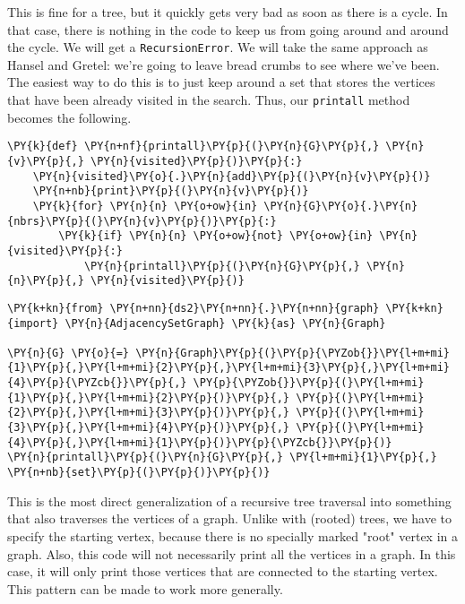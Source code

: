 This is fine for a tree, but it quickly gets very bad as soon as there is a cycle.
In that case, there is nothing in the code to keep us from going around and around the cycle.
We will get a \texttt{RecursionError}.
We will take the same approach as Hansel and Gretel: we're going to leave bread crumbs to see where we've been.
The easiest way to do this is to just keep around a set that stores the vertices that have been already visited in the search.
Thus, our \texttt{printall} method becomes the following.

\begin{Verbatim}[commandchars=\\\{\}]
\PY{k}{def} \PY{n+nf}{printall}\PY{p}{(}\PY{n}{G}\PY{p}{,} \PY{n}{v}\PY{p}{,} \PY{n}{visited}\PY{p}{)}\PY{p}{:}
    \PY{n}{visited}\PY{o}{.}\PY{n}{add}\PY{p}{(}\PY{n}{v}\PY{p}{)}
    \PY{n+nb}{print}\PY{p}{(}\PY{n}{v}\PY{p}{)}
    \PY{k}{for} \PY{n}{n} \PY{o+ow}{in} \PY{n}{G}\PY{o}{.}\PY{n}{nbrs}\PY{p}{(}\PY{n}{v}\PY{p}{)}\PY{p}{:}
        \PY{k}{if} \PY{n}{n} \PY{o+ow}{not} \PY{o+ow}{in} \PY{n}{visited}\PY{p}{:}
            \PY{n}{printall}\PY{p}{(}\PY{n}{G}\PY{p}{,} \PY{n}{n}\PY{p}{,} \PY{n}{visited}\PY{p}{)}
\end{Verbatim}


\begin{Verbatim}[commandchars=\\\{\}]
\PY{k+kn}{from} \PY{n+nn}{ds2}\PY{n+nn}{.}\PY{n+nn}{graph} \PY{k+kn}{import} \PY{n}{AdjacencySetGraph} \PY{k}{as} \PY{n}{Graph}

\PY{n}{G} \PY{o}{=} \PY{n}{Graph}\PY{p}{(}\PY{p}{\PYZob{}}\PY{l+m+mi}{1}\PY{p}{,}\PY{l+m+mi}{2}\PY{p}{,}\PY{l+m+mi}{3}\PY{p}{,}\PY{l+m+mi}{4}\PY{p}{\PYZcb{}}\PY{p}{,} \PY{p}{\PYZob{}}\PY{p}{(}\PY{l+m+mi}{1}\PY{p}{,}\PY{l+m+mi}{2}\PY{p}{)}\PY{p}{,} \PY{p}{(}\PY{l+m+mi}{2}\PY{p}{,}\PY{l+m+mi}{3}\PY{p}{)}\PY{p}{,} \PY{p}{(}\PY{l+m+mi}{3}\PY{p}{,}\PY{l+m+mi}{4}\PY{p}{)}\PY{p}{,} \PY{p}{(}\PY{l+m+mi}{4}\PY{p}{,}\PY{l+m+mi}{1}\PY{p}{)}\PY{p}{\PYZcb{}}\PY{p}{)}
\PY{n}{printall}\PY{p}{(}\PY{n}{G}\PY{p}{,} \PY{l+m+mi}{1}\PY{p}{,} \PY{n+nb}{set}\PY{p}{(}\PY{p}{)}\PY{p}{)}
\end{Verbatim}



This is the most direct generalization of a recursive tree traversal into something that also traverses the vertices of a graph.
Unlike with (rooted) trees, we have to specify the starting vertex, because there is no specially marked "root" vertex in a graph.
Also, this code will not necessarily print all the vertices in a graph.
In this case, it will only print those vertices that are connected to the starting vertex.
This pattern can be made to work more generally.

